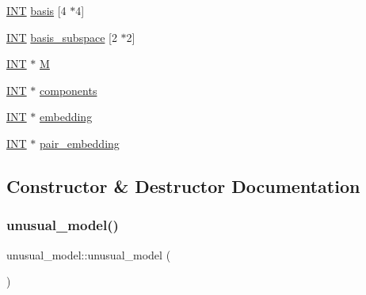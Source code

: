 \begin{DoxyCompactItemize}
\item 
\mbox{\hyperlink{galois_8h_a09fddde158a3a20bd2dcadb609de11dc}{I\+NT}} \mbox{\hyperlink{classunusual__model_ad663e6d85fb8880e5d0c2799beaaae51}{basis}} \mbox{[}4 $\ast$4\mbox{]}
\item 
\mbox{\hyperlink{galois_8h_a09fddde158a3a20bd2dcadb609de11dc}{I\+NT}} \mbox{\hyperlink{classunusual__model_acfe8fd48195e26389c5affd3cef337ac}{basis\+\_\+subspace}} \mbox{[}2 $\ast$2\mbox{]}
\item 
\mbox{\hyperlink{galois_8h_a09fddde158a3a20bd2dcadb609de11dc}{I\+NT}} $\ast$ \mbox{\hyperlink{classunusual__model_a0622af0e9805d8543ecac47e9e832e42}{M}}
\item 
\mbox{\hyperlink{galois_8h_a09fddde158a3a20bd2dcadb609de11dc}{I\+NT}} $\ast$ \mbox{\hyperlink{classunusual__model_a61a98067f289705b81d7005cc2e02c4c}{components}}
\item 
\mbox{\hyperlink{galois_8h_a09fddde158a3a20bd2dcadb609de11dc}{I\+NT}} $\ast$ \mbox{\hyperlink{classunusual__model_a23d9c824b91610ccf8340449fb4e0281}{embedding}}
\item 
\mbox{\hyperlink{galois_8h_a09fddde158a3a20bd2dcadb609de11dc}{I\+NT}} $\ast$ \mbox{\hyperlink{classunusual__model_a00b00b5d07b0177159d75455f4b7c6fe}{pair\+\_\+embedding}}
\end{DoxyCompactItemize}


\subsection{Constructor \& Destructor Documentation}
\mbox{\label{classunusual__model_ad622323db037c81fd1843f9e365f3ab6}} 
\subsubsection{\texorpdfstring{unusual\+\_\+model()}{unusual\_model()}}
{\footnotesize\ttfamily unusual\+\_\+model\+::unusual\+\_\+model (\begin{DoxyParamCaption}{ }\end{DoxyParamCaption})}

\mbox{\label{classunusual__model_a89c6d32fec241c3e88ba08ded5df4828}} 
